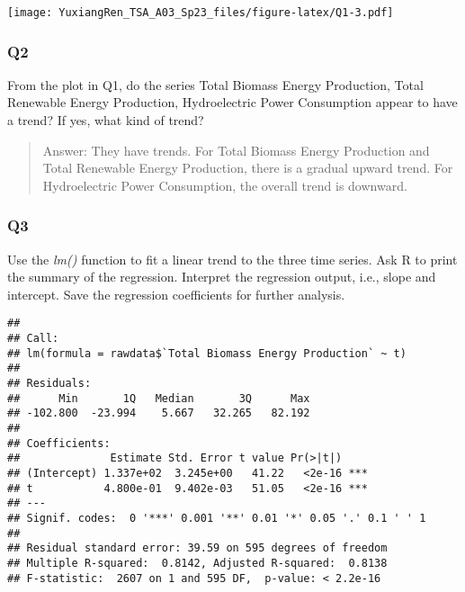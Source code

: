 \documentclass[
]{article}
\newenvironment{Shaded}{\begin{snugshade}}{\end{snugshade}}
\newcommand{\AttributeTok}[1]{\textcolor[rgb]{0.77,0.63,0.00}{#1}}
\newcommand{\CommentTok}[1]{\textcolor[rgb]{0.56,0.35,0.01}{\textit{#1}}}
\newcommand{\DecValTok}[1]{\textcolor[rgb]{0.00,0.00,0.81}{#1}}
\newcommand{\FunctionTok}[1]{\textcolor[rgb]{0.00,0.00,0.00}{#1}}
\newcommand{\NormalTok}[1]{#1}
\newcommand{\OtherTok}[1]{\textcolor[rgb]{0.56,0.35,0.01}{#1}}
\newcommand{\SpecialCharTok}[1]{\textcolor[rgb]{0.00,0.00,0.00}{#1}}
\newcommand{\StringTok}[1]{\textcolor[rgb]{0.31,0.60,0.02}{#1}}
\begin{document}
\texttt{[image: YuxiangRen\_TSA\_A03\_Sp23\_files/figure-latex/Q1-3.pdf]}

\hypertarget{q2}{%
\subsubsection{Q2}\label{q2}}

From the plot in Q1, do the series Total Biomass Energy Production,
Total Renewable Energy Production, Hydroelectric Power Consumption
appear to have a trend? If yes, what kind of trend?

\begin{quote}
Answer: They have trends. For Total Biomass Energy Production and Total
Renewable Energy Production, there is a gradual upward trend. For
Hydroelectric Power Consumption, the overall trend is downward.
\end{quote}

\hypertarget{q3}{%
\subsubsection{Q3}\label{q3}}

Use the \emph{lm()} function to fit a linear trend to the three time
series. Ask R to print the summary of the regression. Interpret the
regression output, i.e., slope and intercept. Save the regression
coefficients for further analysis.

\begin{Shaded}
\end{Shaded}

\begin{verbatim}
## 
## Call:
## lm(formula = rawdata$`Total Biomass Energy Production` ~ t)
## 
## Residuals:
##      Min       1Q   Median       3Q      Max 
## -102.800  -23.994    5.667   32.265   82.192 
## 
## Coefficients:
##              Estimate Std. Error t value Pr(>|t|)    
## (Intercept) 1.337e+02  3.245e+00   41.22   <2e-16 ***
## t           4.800e-01  9.402e-03   51.05   <2e-16 ***
## ---
## Signif. codes:  0 '***' 0.001 '**' 0.01 '*' 0.05 '.' 0.1 ' ' 1
## 
## Residual standard error: 39.59 on 595 degrees of freedom
## Multiple R-squared:  0.8142, Adjusted R-squared:  0.8138 
## F-statistic:  2607 on 1 and 595 DF,  p-value: < 2.2e-16
\end{verbatim}
\end{document}
